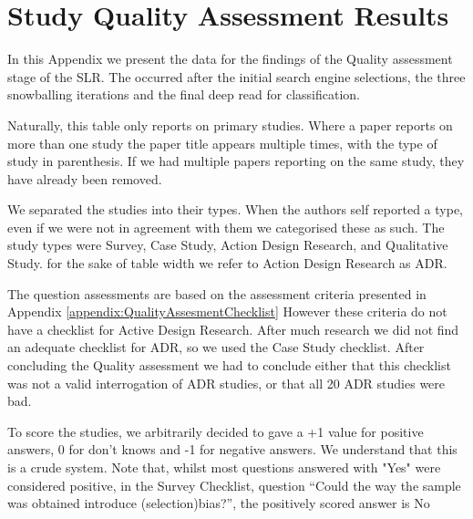 \chapter{Study Quality Assessment Results} 
\label{appendix:Quality_Assessment_Results} 

In this Appendix we present the data for the findings of the Quality assessment stage of the SLR.
The occurred after the initial search engine selections, the three snowballing iterations and the final deep read for classification.

Naturally, this table only reports on primary studies.
Where a paper reports on more than one study the paper title appears multiple times, with the type of study in parenthesis.
If we had multiple papers reporting on the same study, they have already been removed.

We separated the studies into their types.
When the authors self reported a type, even if we were not in agreement with them we categorised these as such.
The study types were Survey, Case Study, Action Design Research, and Qualitative Study.
for the sake of table width we refer to Action Design Research as ADR.

The question assessments are based on the assessment criteria presented in Appendix \ref{appendix:QualityAssesmentChecklist}
However these criteria do not have a checklist for Active Design Research.
After much research we did not find an adequate checklist for ADR, so we used the Case Study checklist.
After concluding the Quality assessment we had to conclude either that this checklist was not a valid interrogation of ADR studies, or that all 20 ADR studies were bad.

To score the studies, we arbitrarily decided to gave a +1 value for positive answers, 0 for don't knows and -1 for negative answers.
We understand that this is a crude system.
Note that, whilst most questions answered with "Yes" were considered positive, in the Survey Checklist, question ``Could the way the sample was obtained introduce (selection)bias?'', the positively scored answer is No

